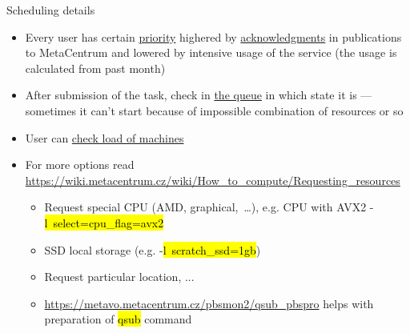 \documentclass[compress, ucs, xelatex, 11pt, xcolor=svgnames, aspectratio=169,
	hyperref={
		bookmarks=true,
		unicode=true,
		colorlinks=true,
		pdftitle={Linux, command line and MetaCentrum},
		plainpages=false,
		pdfauthor={Vojtech Zeisek},
		pdfsubject={Course about use of Linux command line, writing shell scripts and using MetaCentrum of CESNET},
		pdfcreator={XeLaTeX},
		pdfkeywords={Linux, GNU, BASH, shell, command line, MetaCentrum},
		linkcolor=DarkRed, %
		anchorcolor=DarkBlue, %
		citecolor=Indigo, %
		filecolor=NavyBlue, %
		menucolor=DarkMagenta, %
		urlcolor=DarkBlue, %
		pdftex},
	url={hyphens, lowtilde} %
	]{beamer}
\renewcommand{\texttt}[1]{\hl{\ttfamily #1}}
\begin{document}
\begin{frame}[allowframebreaks]{Scheduling details}
\begin{itemize}
		\item Every user has certain \href{https://metavo.metacentrum.cz/pbsmon2/users/}{priority} highered by \href{https://wiki.metacentrum.cz/wiki/Usage_rules/Acknowledgement}{acknowledgments} in publications to MetaCentrum and lowered by intensive usage of the service (the usage is calculated from past month)
		\item After submission of the task, check in \href{https://metavo.metacentrum.cz/pbsmon2/queues/jobsQueued}{the queue} in which state it is --- sometimes it can't start because of impossible combination of resources or so
		\item User can \href{https://metavo.metacentrum.cz/pbsmon2/nodes/physical}{check load of machines}
		\item For more options read \url{https://wiki.metacentrum.cz/wiki/How_to_compute/Requesting_resources}
		\begin{itemize}
			\item Request special CPU (AMD, graphical,~\ldots), e.g. CPU with AVX2 -\texttt{l~select=cpu\_flag=avx2}
			\item SSD local storage (e.g. -\texttt{l~scratch\_ssd=1gb})
			\item Request particular location, ...
			\item \url{https://metavo.metacentrum.cz/pbsmon2/qsub_pbspro} helps with preparation of \texttt{qsub} command
		\end{itemize}
	\end{itemize}
\end{frame}
\end{document}
